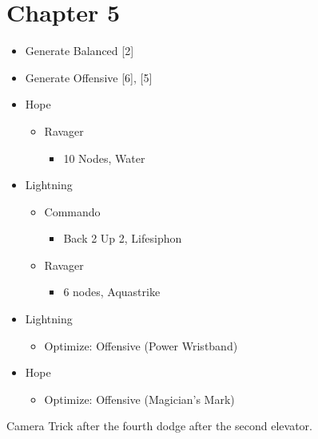 \chapter{Chapter 5}


\renewcommand{\first}{[1] Slash \& Burn (\rav/\com)}
\renewcommand{\second}{[2] War \& Peace (\med/\com)}
\renewcommand{\third}{[3] Supersoldier (\syn/\com)}
\renewcommand{\fourth}{[4] Dualcasting (\rav/\rav)}
\renewcommand{\fifth}{[5] Dualcasting (\rav/\rav)}
\renewcommand{\sixth}{[6] Slash \& Burn (\rav/\com)}
	\begin{menu}
		\begin{itemize}
			\paradigm
			\begin{itemize}
				\item Generate Balanced [2]
				\item Generate Offensive [6], [5]
			\end{itemize}
			\crystarium
			\begin{itemize}
				\item Hope
				      \begin{itemize}
					      \item Ravager
					            \begin{itemize}
						            \item 10 Nodes, Water
					            \end{itemize}
				      \end{itemize}
				\item Lightning
				      \begin{itemize}
					      \item Commando
					            \begin{itemize}
						            \item Back 2 Up 2, Lifesiphon
					            \end{itemize}
					      \item Ravager
					            \begin{itemize}
						            \item 6 nodes, Aquastrike
					            \end{itemize}
				      \end{itemize}
			\end{itemize}
			\equip
			\begin{itemize}
				\item Lightning
				      \begin{itemize}
					      \item Optimize: Offensive (Power Wristband)
				      \end{itemize}
				\item Hope
				      \begin{itemize}
					      \item Optimize: Offensive (Magician's Mark)
				      \end{itemize}
			\end{itemize}
		\end{itemize}
	\end{menu}
	Camera Trick after the fourth dodge after the second elevator.

